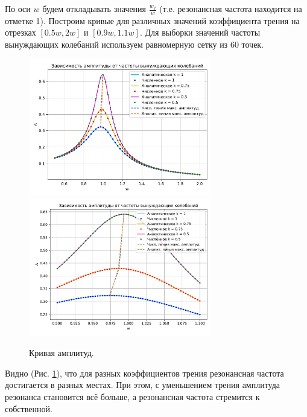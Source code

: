             По оси \( w \) будем откладывать значения \( \frac{w_f}{w} \) (т.е. резонансная частота находится на отметке 1). Построим кривые для различных значений коэффициента трения на отрезках \( [0.5 w, 2 w] \) и \( [0.9 w, 1.1 w] \). Для выборки значений частоты вынуждающих колебаний используем равномерную сетку из 60 точек. 

            \begin{figure}[H]
                \centering
                \includegraphics[width=8cm]{pictures/6res05_20.pdf}
                \includegraphics[width=8cm]{pictures/6res09_11.pdf}
                \caption{Кривая амплитуд.} \label{amp}
            \end{figure}
            Видно (Рис. \ref{amp}), что для разных коэффициентов трения резонансная частота достигается в разных местах. При этом, с уменьшением трения амплитуда резонанса становится всё больше, а резонансная частота стремится к собственной.
            